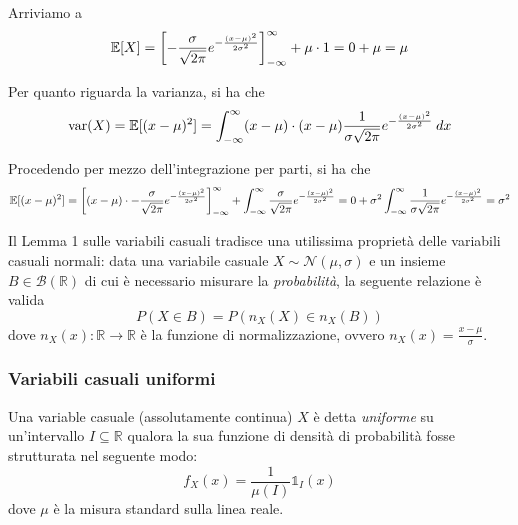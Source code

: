 \documentclass{article}
\begin{document}
                Arriviamo a
                \[
                    \mathbb{E}[X] = \qty[- \frac{\sigma}{\sqrt{2 \pi}} e^{-\frac{(x - \mu)^{2}}{2 \sigma^{2}}}]^{\infty}_{-\infty} + \mu \cdot 1 = 0 + \mu = \mu
                \]

                Per quanto riguarda la varianza, si ha che 
                \[
                    \textnormal{var}(X) = \mathbb{E}[(x - \mu)^{2}] = \int_{-\infty}^{\infty} (x - \mu) \cdot (x - \mu) \frac{1}{\sigma \sqrt{2 \pi}} e^{- \frac{(x - \mu)^{2}}{2 \sigma^{2}}} \: dx
                \]

                Procedendo per mezzo dell'integrazione per parti, si ha che
                \[
                    \mathbb{E}[(x - \mu)^{2}] = \qty[(x - \mu) \cdot - \frac{\sigma}{\sqrt{2 \pi}} e^{-\frac{(x - \mu)^{2}}{2 \sigma^{2}}}]^{\infty}_{-\infty} + \int_{-\infty}^{\infty} \frac{\sigma}{\sqrt{2 \pi}} e^{-\frac{(x - \mu)^{2}}{2 \sigma^{2}}} = 
                    0 + \sigma^{2} \int_{-\infty}^{\infty} \frac{1}{\sigma \sqrt{2 \pi}} e^{-\frac{(x - \mu)^{2}}{2 \sigma^{2}}} =
                    \sigma^{2}
                \]

                Il Lemma 1 sulle variabili casuali tradisce una utilissima proprietà delle variabili casuali normali: data una variabile casuale $X \sim \mathcal{N}(\mu, \sigma)$ e un insieme $B \in \mathcal{B}(\mathbb{R})$ di cui è necessario misurare la \textit{probabilità}, la seguente relazione è valida
                \[
                    P(X \in B) = P(n_{X}(X) \in n_{X}(B))
                \]
                dove $n_{X}(x): \mathbb{R} \rightarrow \mathbb{R}$ è la funzione di normalizzazione, ovvero $n_{X}(x) = \frac{x - \mu}{\sigma}$.

            \vspace{10pt}
            \subsubsection{Variabili casuali uniformi}
                Una variable casuale (assolutamente continua) $X$ è detta \textit{uniforme} su un'intervallo $I \subseteq \mathbb{R}$ qualora la sua funzione di densità di probabilità fosse strutturata nel seguente modo:
                \[
                    f_{X}(x) = \frac{1}{\mu(I)} \mathds{1}_{I}(x)
                \]
                dove $\mu$ è la misura standard sulla linea reale.
\end{document}
